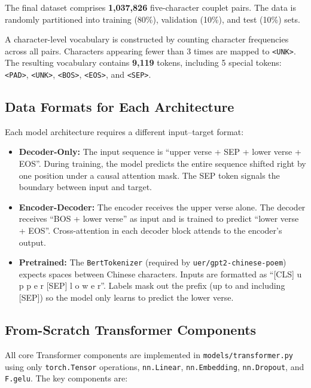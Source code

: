 \documentclass[11pt,a4paper]{article}
\begin{document}
The final dataset comprises \textbf{1,037,826} five-character couplet pairs.
The data is randomly partitioned into training (80\%), validation (10\%), and
test (10\%) sets.

A character-level vocabulary is constructed by counting character frequencies
across all pairs.
Characters appearing fewer than 3 times are mapped to \texttt{<UNK>}.
The resulting vocabulary contains \textbf{9,119} tokens, including 5 special
tokens: \texttt{<PAD>}, \texttt{<UNK>}, \texttt{<BOS>}, \texttt{<EOS>},
and \texttt{<SEP>}.

\subsection{Data Formats for Each Architecture}

Each model architecture requires a different input--target format:

\begin{itemize}[nosep]
    \item \textbf{Decoder-Only:}
          The input sequence is ``upper verse + SEP + lower verse + EOS''.
          During training, the model predicts the entire sequence shifted right
          by one position under a causal attention mask.
          The SEP token signals the boundary between input and target.
    \item \textbf{Encoder-Decoder:}
          The encoder receives the upper verse alone.
          The decoder receives ``BOS + lower verse'' as input and is trained
          to predict ``lower verse + EOS''.
          Cross-attention in each decoder block attends to the encoder's
          output.
    \item \textbf{Pretrained:}
          The \texttt{BertTokenizer} (required by
          \texttt{uer/gpt2-chinese-poem}) expects spaces between Chinese
          characters.
          Inputs are formatted as ``[CLS] u p p e r [SEP] l o w e r''.
          Labels mask out the prefix (up to and including [SEP]) so the model
          only learns to predict the lower verse.
\end{itemize}

\subsection{From-Scratch Transformer Components}
\label{sec:components}

All core Transformer components are implemented in
\texttt{models/transformer.py} using only \texttt{torch.Tensor} operations,
\texttt{nn.Linear}, \texttt{nn.Embedding}, \texttt{nn.Dropout}, and
\texttt{F.gelu}.
The key components are:
\end{document}
